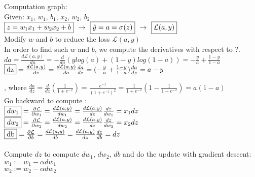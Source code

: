 \documentclass{article}
\begin{document}
Computation graph:\\

Given: $x_1$, $w_1$, $b_1$,  $x_2$, $w_2$, $b_2$\\

$\fbox{$z = w_1 x_1 + w_2 x_2 +b$}$
$\rightarrow$
$\fbox{$\hat y = a = \sigma(z)$}$
$\rightarrow$
$\fbox{$\mathcal{L}(a,y)$}$\\

Modify $w$ and $b$ to reduce the loss $\mathcal{L}(a,y)$\\

In order to find such $w$ and $b$, we compute the derivatives with respect to ?.\\

$da = \frac{d\mathcal{L}(a,y)}{da} = -\frac{d}{da} (ylog(a) + (1-y)log(1-a)) = -\frac{y}{a} + \frac{1-y}{1-a}$\\

$\fbox{dz} = \frac{d\mathcal{L}(a,y)}{dz} = \frac{d\mathcal{L}(a,y)}{da} \frac{da}{dz} = (-\frac{y}{a}+\frac{1-y}{1-a})\frac{da}{dz}= a-y$

, where $\frac{da}{dz} = \frac{d}{dz}(\frac{1}{1+e^{-z}}) = \frac{e^{-z}}{(1+e^{-z})^2} = \frac{1}{1+e^{-z}}(1-\frac{1}{1+e^{-z}})= a(1-a)$\\

Go backward to compute :\\

$\fbox{$dw_1$} = \frac{\partial \mathcal{L}}{\partial w_1} =\frac{d\mathcal{L}(a,y)}{dw_1} =\frac{d\mathcal{L}(a,y)}{dz} \frac{dz}{dw_1}= x_1 dz$\\

$\fbox{$dw_2$} = \frac{\partial \mathcal{L}}{\partial w_2} =\frac{d\mathcal{L}(a,y)}{dw_2} =\frac{d\mathcal{L}(a,y)}{dz} \frac{dz}{dw_2}= x_2 dz$\\

$\fbox{db} = \frac{\partial \mathcal{L}}{\partial b} =\frac{d\mathcal{L}(a,y)}{db} =\frac{d\mathcal{L}(a,y)}{dz} \frac{dz}{db}= dz$\\\\

Compute $dz$ to compute $dw_1$, $dw_2$, $db$ and do the update with gradient descent:\\

$w_1 := w_1 - \alpha dw_1$\\

$w_2 := w_2 - \alpha dw_2$\\
\end{document}
